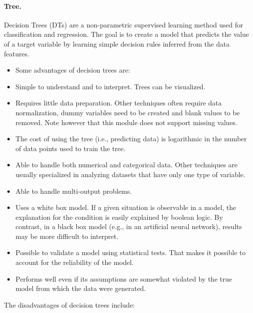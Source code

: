 \paragraph{Tree.}
\label{tree}
Decision Trees (DTs) are a non-parametric supervised learning method used for classification and regression. The goal is to create a model that predicts the value of a target variable by learning simple decision rules inferred from the data features.
\begin{itemize}
\item Some advantages of decision trees are:
\item  Simple to understand and to interpret. Trees can be visualized.
\item Requires little data preparation. Other techniques often require data normalization, dummy variables need to be created and blank values to be removed. Note however that this module does not support missing values.
\item The cost of using the tree (i.e., predicting data) is logarithmic in the number of data points used to train the tree.
\item  Able to handle both numerical and categorical data. Other techniques are usually specialized in analyzing datasets that have only one type of variable. 
\item Able to handle multi-output problems.
\item  Uses a white box model. If a given situation is observable in a model, the explanation for the condition is easily explained by boolean logic. By contrast, in a black box model (e.g., in an artificial neural network), results may be more difficult to interpret.
\item Possible to validate a model using statistical tests. That makes it possible to account for the reliability of the model.
\item Performs well even if its assumptions are somewhat violated by the true model from which the data were generated.
\end{itemize}
The disadvantages of decision trees include:
